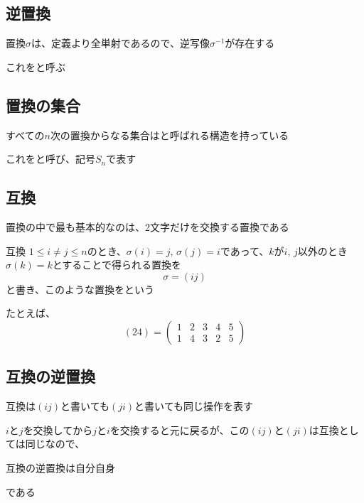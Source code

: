\documentclass[../../../topic_linear-algebra]{subfiles}
\begin{document}
\subsection{逆置換}

置換$\sigma$は、定義より全単射であるので、逆写像$\sigma^{-1}$が存在する

これをと呼ぶ

\subsection{置換の集合}

すべての$n$次の置換からなる集合はと呼ばれる構造を持っている

これをと呼び、記号$S_n$で表す

\subsection{互換}

置換の中で最も基本的なのは、2文字だけを交換する置換である

\begin{definition}{互換}
  $1 \leq i \neq j \leq n$のとき、$\sigma(i) = j,\, \sigma(j) = i$であって、$k$が$i,\,j$以外のとき$\sigma(k)=k$とすることで得られる置換を
  \begin{equation*}
    \sigma = (ij)
  \end{equation*}
  と書き、このような置換をという
\end{definition}

たとえば、
\begin{equation*}
  (24) = \begin{pmatrix}
    1 & 2 & 3 & 4 & 5 \\
    1 & 4 & 3 & 2 & 5
  \end{pmatrix}
\end{equation*}

\subsection{互換の逆置換}

互換は$(ij)$と書いても$(ji)$と書いても同じ操作を表す

$i$と$j$を交換してから$j$と$i$を交換すると元に戻るが、この$(ij)$と$(ji)$は互換としては同じなので、
\begin{shaded}
  互換の逆置換は自分自身
\end{shaded}
である
\end{document}
